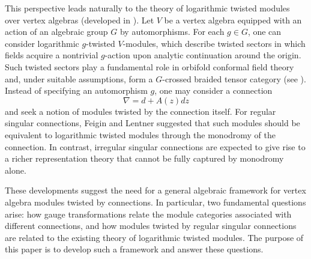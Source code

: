 \documentclass[final,reqno]{amsart}
\begin{document}
This perspective leads naturally to the theory of logarithmic twisted modules over vertex algebras (developed in \cite{Hua10,Bak16}). Let $V$ be a vertex algebra equipped with an action of an algebraic group $G$ by automorphisms. For each $g\in G$, one can consider logarithmic $g$-twisted $V$-modules, which describe twisted sectors in which fields acquire a nontrivial $g$-action upon analytic continuation around the origin. Such twisted sectors play a fundamental role in orbifold conformal field theory and, under suitable assumptions, form a $G$-crossed braided tensor category (see \cite{McR21,DH26,Xu26}). Instead of specifying an automorphism $g$, one may consider a connection
\[
    \nabla=d+A(z)dz
\]
and seek a notion of modules twisted by the connection itself. For regular singular connections, Feigin and Lentner suggested that such modules should be equivalent to logarithmic twisted modules through the monodromy of the connection. In contrast, irregular singular connections are expected to give rise to a richer representation theory that cannot be fully captured by monodromy alone.


These developments suggest the need for a general algebraic framework for vertex algebra modules twisted by connections. In particular, two fundamental questions arise: how gauge transformations relate the module categories associated with different connections, and how modules twisted by regular singular connections are related to the existing theory of logarithmic twisted modules. The purpose of this paper is to develop such a framework and answer these questions.
\end{document}
